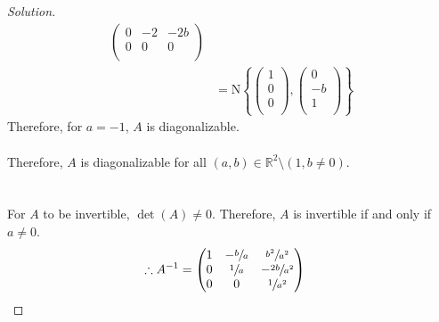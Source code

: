\documentclass[fleqn, a4paper, 12pt]{article}
\theoremstyle{definition}
\theoremstyle{theorem}
\theoremstyle{remark}
\newcommand{\N}{\mathrm{N}}
\newenvironment{solution} %
	{\begin{proof}[Solution]\let\qed\relax}
	{\end{proof}}
\numberwithin{corollary}{theorem}
\numberwithin{equation}{theorem}
\begin{document}
\begin{solution}
\begin{align*}
\begin{pmatrix}
				0 & -2 & -2b\\
				0 & 0 & 0\\
			\end{pmatrix}\\
		&= \N
			\left\lbrace
				\begin{pmatrix}
					1\\
					0\\
					0\\
				\end{pmatrix}
				,
				\begin{pmatrix}
					0\\
					-b\\
					1\\
				\end{pmatrix}
			\right\rbrace
	\end{align*}
	Therefore, for $a = -1$, $A$ is diagonalizable.\\
	~\\
	Therefore, $A$ is diagonalizable for all $(a,b) \in \mathbb{R}^2 \setminus (1, b \neq 0)$.\\
	~\\
	~\\
	For $A$ to be invertible, $\det(A) \neq 0$. Therefore, $A$ is invertible if and only if $a \neq 0$.\\
	\begin{align*}
		\therefore A^{-1} &=
			\begin{pmatrix}
				1 & -\sfrac{b}{a} & \sfrac{b^2}{a^2}\\
				0 & \sfrac{1}{a} & -\sfrac{2b}{a^2}\\
				0 & 0 & \sfrac{1}{a^2}\\
			\end{pmatrix}
	\end{align*}
\end{solution}
\end{document}
